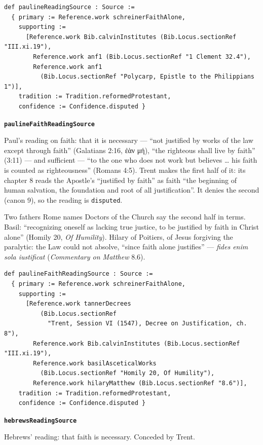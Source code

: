 \documentclass[11pt,paper=\testimonypaper,DIV=13,parskip=false]{scrartcl}
\begin{document}
{\small\begin{verbatim}
def paulineReadingSource : Source :=
  { primary := Reference.work schreinerFaithAlone,
    supporting :=
      [Reference.work Bib.calvinInstitutes (Bib.Locus.sectionRef "III.xi.19"),
        Reference.work anf1 (Bib.Locus.sectionRef "1 Clement 32.4"),
        Reference.work anf1
          (Bib.Locus.sectionRef "Polycarp, Epistle to the Philippians 1")],
    tradition := Tradition.reformedProtestant,
    confidence := Confidence.disputed }
\end{verbatim}}
\par\medskip\noindent\textbf{\texttt{pauline\allowbreak{}Faith\allowbreak{}Reading\allowbreak{}Source}}\par\nobreak\noindent
Paul’s reading on faith: that it is necessary — “not justified by works of the law except through faith” (Galatians 2:16, ἐὰν μή), “the righteous shall live by faith” (3:11) — and sufficient — “to the one who does not work but believes … his faith is counted as righteousness” (Romans 4:5). Trent makes the first half of it: its chapter 8 reads the Apostle’s “justified by faith” as faith “the beginning of human salvation, the foundation and root of all justification”. It denies the second (canon 9), so the reading is \texttt{disputed}.

Two fathers Rome names Doctors of the Church say the second half in terms. Basil: “recognizing oneself as lacking true justice, to be justified by faith in Christ alone” (Homily 20, \emph{Of Humility}). Hilary of Poitiers, of Jesus forgiving the paralytic: the Law could not absolve, “since faith alone justifies” — \emph{fides enim sola iustificat} (\emph{Commentary on Matthew} 8.6).

{\small\begin{verbatim}
def paulineFaithReadingSource : Source :=
  { primary := Reference.work schreinerFaithAlone,
    supporting :=
      [Reference.work tannerDecrees
          (Bib.Locus.sectionRef
            "Trent, Session VI (1547), Decree on Justification, ch. 8"),
        Reference.work Bib.calvinInstitutes (Bib.Locus.sectionRef "III.xi.19"),
        Reference.work basilAsceticalWorks
          (Bib.Locus.sectionRef "Homily 20, Of Humility"),
        Reference.work hilaryMatthew (Bib.Locus.sectionRef "8.6")],
    tradition := Tradition.reformedProtestant,
    confidence := Confidence.disputed }
\end{verbatim}}
\par\medskip\noindent\textbf{\texttt{hebrews\allowbreak{}Reading\allowbreak{}Source}}\par\nobreak\noindent
Hebrews’ reading: that faith is necessary. Conceded by Trent.
\end{document}
